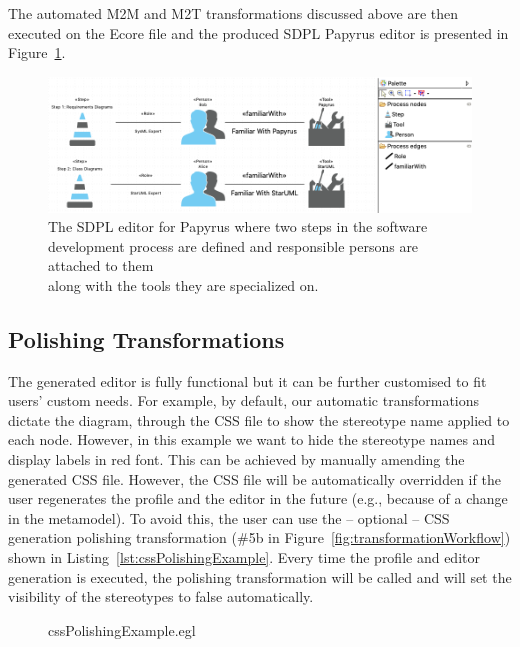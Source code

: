The automated M2M and M2T transformations discussed above are then executed on the Ecore file and the produced SDPL Papyrus editor is presented in Figure~\ref{fig:sdplEditor}. 

\begin{figure}[ht!]
	\centering
	\includegraphics[width=1\textwidth]{images/sdplEditor.png}
	\caption[]{The SDPL editor for Papyrus where two steps in the software 
		development process are defined and responsible persons are attached to 
		them\\ along with the tools they are specialized on.}
	\label{fig:sdplEditor}
\end{figure}

\subsection{Polishing Transformations}
The generated editor is fully functional but it can be further customised to fit users' custom needs. 
For example, by default, our automatic transformations dictate the diagram, through the CSS file to show the stereotype name applied to each node. 
However, in this example we want to hide the stereotype names and display labels in red font. 
This can be achieved by manually amending the generated CSS file. 
However, the CSS file will be automatically overridden if the user regenerates the profile and the editor in the future (e.g., because of a change in the metamodel). 
To avoid this, the user can use the -- optional -- CSS generation polishing transformation (\#5b in Figure~\ref{fig:transformationWorkflow}) shown in Listing~\ref{lst:cssPolishingExample}. 
Every time the profile and editor generation is executed, the polishing transformation will be called and will set the visibility of the stereotypes to false automatically. 

\begin{figure}
	
	{cssPolishingExample.egl}
\end{figure}

